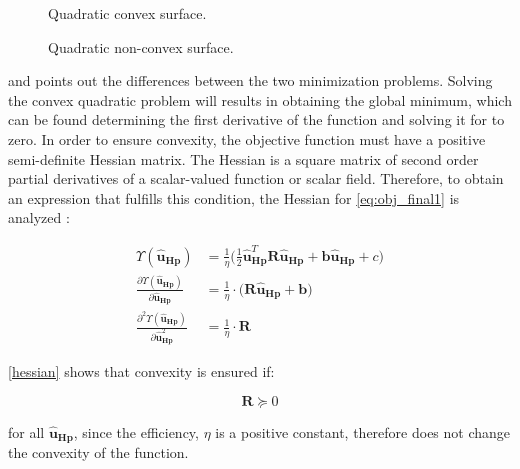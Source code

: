 \begin{figure}[H]
  \centering
  \begin{minipage}[h]{0.45\textwidth}
  \centering
     
    \caption{Quadratic convex surface.}
    \label{convexfig}
  \end{minipage}
  \hfill
  \begin{minipage}[h]{0.45\textwidth}
  \centering
     
    \caption{Quadratic non-convex surface.}
    \label{nonconvexfig}
  \end{minipage}
  \label{fig:nonlinearpumps}
\end{figure}

  and  points out the differences between the two minimization problems. Solving the convex quadratic problem will results in obtaining the global minimum, which can be found determining the first derivative of the function and solving it for to zero. 
 In order to ensure convexity, the objective function must have a positive semi-definite Hessian matrix. The Hessian is a square matrix of second order partial derivatives of a scalar-valued function or scalar field. Therefore, to obtain an expression that fulfills this condition, the Hessian for \eqref{eq:obj_final1} is analyzed : 

\begin{align}
%
\Upsilon(\bm{\hat{u}}_{\bm{Hp}}) &= \frac{1}{\eta}\bigg( \frac{1}{2} \bm{\hat{u}}_{\bm{Hp}}^{T} \bm{R} \bm{\hat{u}}_{\bm{Hp}} + \bm{b} \bm{\hat{u}}_{\bm{Hp}} + c \bigg)\\
%
\frac{\partial \Upsilon(\bm{\hat{u}}_{\bm{Hp}})}{\partial \bm{\hat{u}}_{\bm{Hp}}} &= \frac{1}{\eta}\cdot \big(\bm{R} \bm{\hat{u}}_{\bm{Hp}} + \bm{b} \big)\\
%
\frac{\partial^2 \Upsilon(\bm{\hat{u}}_{\bm{Hp}})}{\partial {\bm{\hat{u}}}^{2}_{\bm{Hp}}} &= \frac{1}{\eta}\cdot \bm{R} 
\label{hessian}
%
\end{align}

\eqref{hessian} shows that convexity is ensured if:

\begin{equation}
\bm{R} \succeq 0  
\end{equation}

for all $\bm{\hat{u}}_{\bm{Hp}} $, since the efficiency, $\eta$ is a positive constant, therefore does not change the convexity of the function. 

